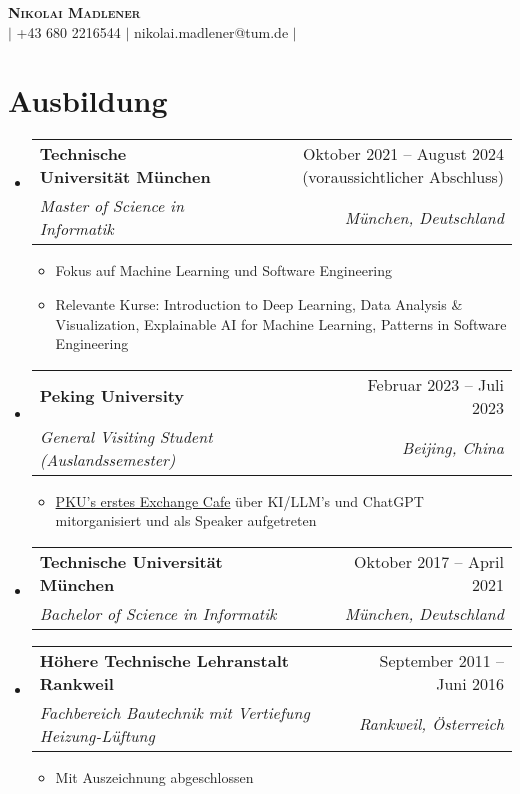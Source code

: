 \documentclass[letterpaper,11pt]{article}
\makeatletter
\newcommand{\resumeItem}[1]{
  \item\small{
    {#1 \vspace{-2pt}}
  }
}
\newcommand{\resumeSubheading}[4]{
  \vspace{-2pt}\item
    \begin{tabular*}{0.97\textwidth}[t]{l@{\extracolsep{\fill}}r}
      \textbf{#1} & #2 \\
      \textit{\small#3} & \textit{\small #4} \\
    \end{tabular*}\vspace{-7pt}
}
\newcommand{\resumeSubHeadingListStart}{\begin{itemize}[leftmargin=0.15in, label={}]}
\newcommand{\resumeSubHeadingListEnd}{\end{itemize}}
\newcommand{\resumeItemListStart}{\begin{itemize}}
\newcommand{\resumeItemListEnd}{\end{itemize}\vspace{-5pt}}
\makeatother
\begin{document}

\begin{center}
  \textbf{\Huge \scshape Nikolai Madlener} \\ \vspace{1pt}
  \href{https://www.linkedin.com/in/nikolai-madlener-163b14169/}{\faLinkedinSquare} $|$
  \small +43 680 2216544 $|$ {{nikolai.madlener@tum.de}} $|$
  \href{https://github.com/NikolaiMadlener}{\faGithub}
  
\end{center}

\section{Ausbildung}  
\resumeSubHeadingListStart
  \resumeSubheading
      {Technische Universität München}{Oktober 2021 -- August 2024 (voraussichtlicher Abschluss)}
      {Master of Science in Informatik}{München, Deutschland}
      \resumeItemListStart
        \resumeItem{Fokus auf Machine Learning und Software Engineering}
        \resumeItem{Relevante Kurse: Introduction to Deep Learning, Data Analysis \& Visualization, Explainable AI for Machine Learning, Patterns in Software Engineering }
      \resumeItemListEnd
    \resumeSubheading
      {Peking University}{Februar 2023 -- Juli 2023}
      {General Visiting Student (Auslandssemester)}{Beijing, China}
      \resumeItemListStart
        \resumeItem{\href{https://newsen.pku.edu.cn/news_events/news/campus/13276.html}{PKU's erstes Exchange Cafe} über KI/LLM's und ChatGPT mitorganisiert und als Speaker aufgetreten}
      \resumeItemListEnd

    \resumeSubheading
      {Technische Universität München}{Oktober 2017 -- April 2021}
      {Bachelor of Science in Informatik}{München, Deutschland}
    \resumeSubheading
      {Höhere Technische Lehranstalt Rankweil}{September 2011 -- Juni 2016}
      {Fachbereich Bautechnik mit Vertiefung Heizung-Lüftung}{Rankweil, Österreich}
      \resumeItemListStart
      \resumeItem{Mit Auszeichnung abgeschlossen}
      \resumeItemListEnd
  \resumeSubHeadingListEnd
\end{document}
